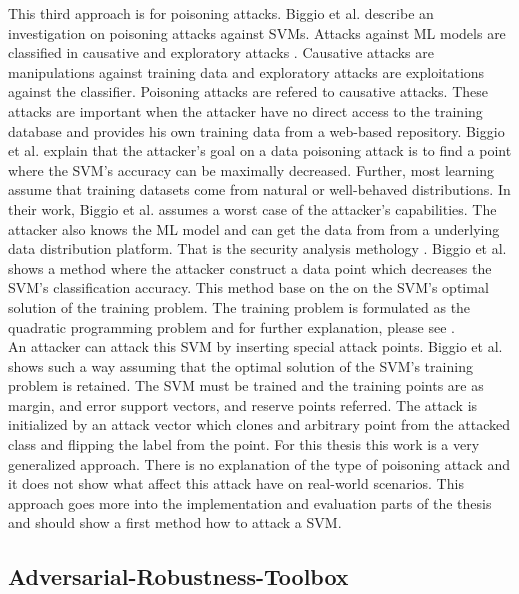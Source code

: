 This third approach is for poisoning attacks. Biggio et al. \cite{DBLP:conf/icml/BiggioNL12} describe an investigation on poisoning attacks against SVMs. Attacks against ML models are classified in causative and exploratory attacks \cite{DBLP:conf/ccs/BarrenoNSJT06}. Causative attacks are manipulations against training data and exploratory attacks are exploitations against the classifier. Poisoning attacks are refered to causative attacks. These attacks are important when the attacker have no direct access to the training database and provides his own training data from a web-based repository. Biggio et al. explain that the attacker's goal on a data poisoning attack is to find a point where the SVM's accuracy can be maximally decreased. Further, most learning assume that training datasets come from natural or well-behaved distributions. In their work, Biggio et al. assumes a worst case of the attacker's capabilities. The attacker also knows the ML model and can get the data from from a underlying data distribution platform. That is the security analysis methology \cite{DBLP:journals/ml/BarrenoNJT10}. Biggio et al. shows a method where the attacker construct a data point which decreases the SVM's classification accuracy. This method base on the on the SVM's optimal solution of the training problem. The training problem is formulated as the quadratic
programming problem and for further explanation, please see \cite{Papadonikolakis2009PerformanceCO}. \\
An attacker can attack this SVM by inserting special attack points. Biggio et al. shows such a way assuming that the optimal solution of the SVM's training problem is retained. The SVM must be trained and the training points are as margin, and error support vectors, and reserve points referred. The attack is initialized by an attack vector which clones and arbitrary point from the attacked class and flipping the label from the point. For this thesis this work is a very generalized approach. There is no explanation of the type of poisoning attack and it does not show what affect this attack have on real-world scenarios. This approach goes more into the implementation and evaluation parts of the thesis and should show a first method how to attack a SVM.


\subsection{Adversarial-Robustness-Toolbox}

